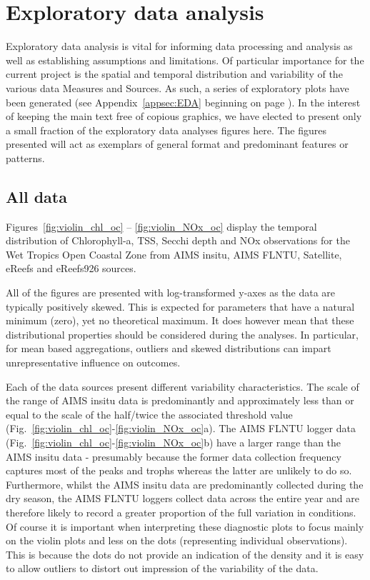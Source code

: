 \section{Exploratory data analysis}\label{sec:EDA}

Exploratory data analysis is vital for informing data processing and analysis as well as
establishing assumptions and limitations.  Of particular importance for the current project is the
spatial and temporal distribution and variability of the various data Measures and Sources.  As
such, a series of exploratory plots have been generated (see Appendix~\ref{appsec:EDA} beginning on
page \pageref{appsec:EDA}).  In the interest of keeping the main text free of copious graphics, we
have elected to present only a small fraction of the exploratory data analyses figures here.  The
figures presented will act as exemplars of general format and predominant features or patterns.

\subsection{All data}

Figures~\ref{fig:violin_chl_oc} -- \ref{fig:violin_NOx_oc} display the temporal distribution of
Chlorophyll-a, TSS, Secchi depth and NOx observations for the Wet Tropics Open Coastal Zone from
AIMS insitu, AIMS FLNTU, Satellite, eReefs and eReefs926 sources.

All of the figures are presented with log-transformed y-axes as the data are typically positively
skewed.  This is expected for parameters that have a natural minimum (zero), yet no theoretical
maximum.  It does however mean that these distributional properties should be considered during the
analyses.  In particular, for mean based aggregations, outliers and skewed distributions can impart
unrepresentative influence on outcomes.

Each of the data sources present different variability characteristics.  The scale of the range of
AIMS insitu data is predominantly and approximately less than or equal to the scale of the
half/twice the associated threshold value (Fig.~\ref{fig:violin_chl_oc}-\ref{fig:violin_NOx_oc}a).
The AIMS FLNTU logger data (Fig.~\ref{fig:violin_chl_oc}-\ref{fig:violin_NOx_oc}b) have a larger
range than the AIMS insitu data - presumably because the former data collection frequency captures
most of the peaks and trophs whereas the latter are unlikely to do so.  Furthermore, whilst the AIMS
insitu data are predominantly collected during the dry season, the AIMS FLNTU loggers collect data
across the entire year and are therefore likely to record a greater proportion of the full variation
in conditions.  Of course it is important when interpreting these diagnostic plots to focus mainly
on the violin plots and less on the dots (representing individual observations).  This is because
the dots do not provide an indication of the density and it is easy to allow outliers to distort out
impression of the variability of the data.

